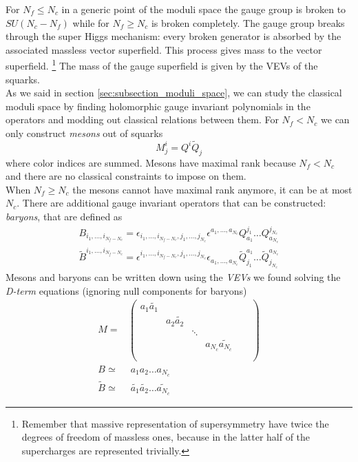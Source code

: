 For $N_f \le N_c$ in a generic point of the moduli space the gauge group is broken to $SU(N_c - N_f)$ while for $N_f \geq N_c$ is broken completely.
The gauge group breaks through the super Higgs mechanism: every broken generator is absorbed by the associated massless vector superfield.
This process gives mass to the vector superfield.  
\footnote{Remember that massive representation of supersymmetry have twice the degrees of freedom of massless ones, because in the latter half of the supercharges are represented trivially.}
The mass of the gauge superfield is given by the VEVs of the squarks.
\\
As we said in section \ref{sec:subsection_moduli_space}, we can  study the classical moduli space by finding holomorphic gauge invariant polynomials in the operators and modding out classical relations between them.
For $N_f < N_c$ we can only construct \emph{mesons} out of squarks
\begin{equation}
  M^i_j = Q^i \tilde{Q}_j
 \end{equation} 
where color indices are summed. 
Mesons have maximal rank because $N_f < N_c$ and there are no classical constraints to impose on them. \\
When $N_f \geq N_c$ the mesons cannot have maximal rank anymore, it can be at most $N_c$.
There are additional gauge invariant operators that can be constructed: \emph{baryons}, that are defined as
\begin{align}
 B_{ i_1, \dotsc, i_{N_f - N_c}} = \epsilon_{i_1, \dotsc, i_{N_f - N_c}, j_1 ,\dotsc, j_{N_c}} \epsilon^{a_1 , \dotsc, a_{N_c}} Q^{j_1}_{a_1} \dots Q^{j_{N_c}}_{a_{N_c}}
 \\
 \tilde{B}^{ i_1, \dotsc, i_{N_f - N_c}} = \epsilon^{i_1, \dotsc, i_{N_f - N_c}, j_1 , \dotsc, j_{N_c}} \epsilon_{a_1 , \dotsc, a_{N_c}} \tilde{Q}_{j_1}^{a_1} \dots \tilde{Q}_{j_{N_c}}^{a_{N_c}}
\end{align}
Mesons and baryons can be written down using the \emph{VEVs} we found solving the \emph{D-term} equations (ignoring null components for baryons)
\begin{align}
M =& \begin{pmatrix}
a_1 \tilde{a_1} & & & & & \\
				& a_2 \tilde{a_2}	& 		&		 & & \\
				&				 	& \ddots&		& 	& \\
				&					&		& a_{N_c} \tilde{a_{N_c}} & \\
				& & & & & \\	
\end{pmatrix}
\\
B  \simeq & \;  a_1 a_2 \dots a_{N_c} 
\\
\tilde{B} \simeq & \;  \tilde{a_1} \tilde{a_2}\dots \tilde{a_{N_c}}
\end{align}
